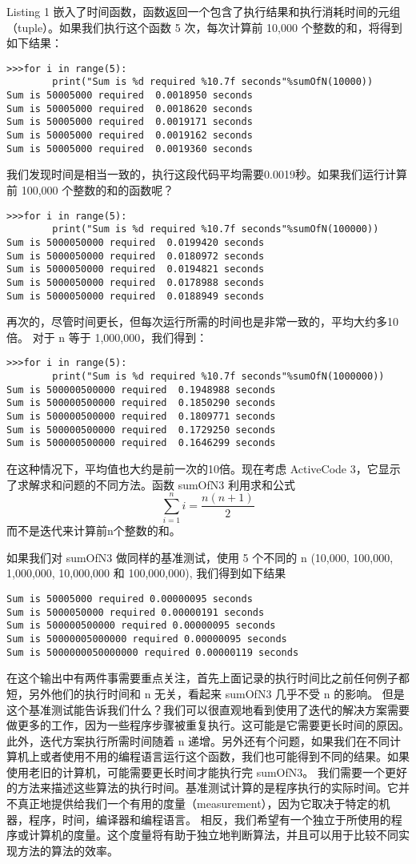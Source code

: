 

Listing 1 嵌入了时间函数，函数返回一个包含了执行结果和执行消耗时间的元组（tuple）。如果我们执行这个函数 5 次，每次计算前 10,000 个整数的和，将得到如下结果：
\begin{lstlisting}
>>>for i in range(5):
        print("Sum is %d required %10.7f seconds"%sumOfN(10000))
Sum is 50005000 required  0.0018950 seconds
Sum is 50005000 required  0.0018620 seconds
Sum is 50005000 required  0.0019171 seconds
Sum is 50005000 required  0.0019162 seconds
Sum is 50005000 required  0.0019360 seconds
\end{lstlisting}

我们发现时间是相当一致的，执行这段代码平均需要0.0019秒。如果我们运行计算前 100,000 个整数的和的函数呢？
\begin{lstlisting}
>>>for i in range(5):
        print("Sum is %d required %10.7f seconds"%sumOfN(100000))
Sum is 5000050000 required  0.0199420 seconds
Sum is 5000050000 required  0.0180972 seconds
Sum is 5000050000 required  0.0194821 seconds
Sum is 5000050000 required  0.0178988 seconds
Sum is 5000050000 required  0.0188949 seconds
\end{lstlisting}

再次的，尽管时间更长，但每次运行所需的时间也是非常一致的，平均大约多10倍。 对于 n 等于 1,000,000，我们得到：
\begin{lstlisting}
>>>for i in range(5):
        print("Sum is %d required %10.7f seconds"%sumOfN(1000000))
Sum is 500000500000 required  0.1948988 seconds
Sum is 500000500000 required  0.1850290 seconds
Sum is 500000500000 required  0.1809771 seconds
Sum is 500000500000 required  0.1729250 seconds
Sum is 500000500000 required  0.1646299 seconds
\end{lstlisting}
在这种情况下，平均值也大约是前一次的10倍。现在考虑 ActiveCode 3，它显示了求解求和问题的不同方法。函数 sumOfN3 利用求和公式
$$
\sum_{i=1}^n i = \frac{n(n+1)}2
$$
而不是迭代来计算前n个整数的和。 



如果我们对 sumOfN3 做同样的基准测试，使用 5 个不同的 n (10,000, 100,000, 1,000,000, 10,000,000 和 100,000,000), 我们得到如下结果
\begin{lstlisting}
Sum is 50005000 required 0.00000095 seconds
Sum is 5000050000 required 0.00000191 seconds
Sum is 500000500000 required 0.00000095 seconds
Sum is 50000005000000 required 0.00000095 seconds
Sum is 5000000050000000 required 0.00000119 seconds
\end{lstlisting}
在这个输出中有两件事需要重点关注，首先上面记录的执行时间比之前任何例子都短，另外他们的执行时间和 n 无关，看起来 sumOfN3 几乎不受 n 的影响。
但是这个基准测试能告诉我们什么？我们可以很直观地看到使用了迭代的解决方案需要做更多的工作，因为一些程序步骤被重复执行。这可能是它需要更长时间的原因。此外，迭代方案执行所需时间随着 n 递增。另外还有个问题，如果我们在不同计算机上或者使用不用的编程语言运行这个函数，我们也可能得到不同的结果。如果使用老旧的计算机，可能需要更长时间才能执行完 sumOfN3。
我们需要一个更好的方法来描述这些算法的执行时间。基准测试计算的是程序执行的实际时间。它并不真正地提供给我们一个有用的度量（measurement），因为它取决于特定的机器，程序，时间，编译器和编程语言。 相反，我们希望有一个独立于所使用的程序或计算机的度量。这个度量将有助于独立地判断算法，并且可以用于比较不同实现方法的算法的效率。
